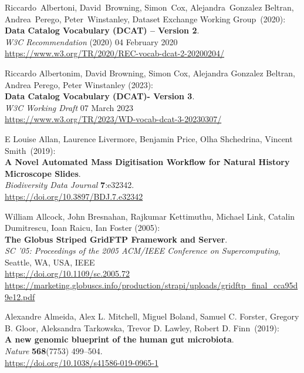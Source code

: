 \begin{thebibliography}{9}
Riccardo~Albertoni, David~Browning, Simon~Cox,
Alejandra~Gonzalez Beltran, Andrea~Perego, Peter~Winstanley, Dataset
Exchange Working Group~(2020):\\
\textbf{Data Catalog Vocabulary (DCAT) -- Version 2}.\\
\emph{W3C Recommendation} (2020)  04 February 2020 \\
\url{https://www.w3.org/TR/2020/REC-vocab-dcat-2-20200204/}

Riccardo Albertonim, David Browning, Simon Cox, Alejandra Gonzalez Beltran, Andrea Perego, Peter Winstanley (2023): \\
\textbf{Data Catalog Vocabulary (DCAT)- Version 3}.\\
\emph{W3C Working Draft} 07 March 2023\\
\url{https://www.w3.org/TR/2023/WD-vocab-dcat-3-20230307/}

E Louise Allan, Laurence Livermore, Benjamin Price, Olha Shchedrina, Vincent Smith~(2019):\\
\textbf{A Novel Automated Mass Digitisation Workflow for Natural
History Microscope Slides}.\\
\emph{Biodiversity Data Journal} \textbf{7}:e32342.\\
\url{https://doi.org/10.3897/BDJ.7.e32342}

William Allcock, John Bresnahan, Rajkumar Kettimuthu, Michael Link, Catalin Dumitrescu, Ioan Raicu, Ian Foster (2005):\\
\textbf{The Globus Striped GridFTP Framework and Server}.\\
\emph{{SC '05: Proceedings of the 2005 ACM/IEEE Conference on Supercomputing}},
{Seattle, WA, USA}, {IEEE} \\
\url{https://doi.org/10.1109/sc.2005.72}\\
\url{https://marketing.globuscs.info/production/strapi/uploads/gridftp_final_cca95d9e12.pdf}

Alexandre Almeida, Alex L. Mitchell, Miguel Boland, Samuel C.
Forster, Gregory B. Gloor, Aleksandra Tarkowska, Trevor D. Lawley,
Robert D. Finn~(2019):\\
\textbf{A new genomic blueprint of the human gut microbiota}.\\
\emph{Nature} \textbf{568}(7753) 499--504.\\
\url{https://doi.org/10.1038/s41586-019-0965-1}


\end{thebibliography}
